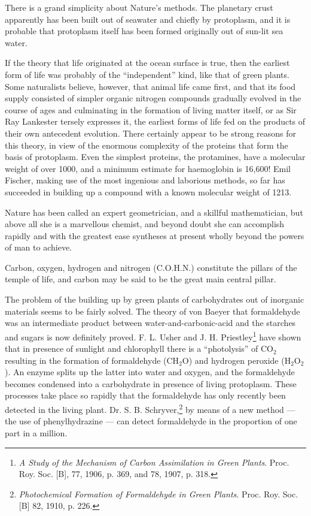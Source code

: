 \documentclass[a4paper, 12pt, oneside, landscape]{article}
\begin{document}
There is a grand simplicity about Nature's methods. The planetary crust apparently has been built out of seawater and chiefly by protoplasm, and it is probable that protoplasm itself has been formed originally out of sun-lit sea water.

If the theory that life originated at the ocean surface is true, then the earliest form of life was probably of the ``independent'' kind, like that of green plants. Some naturalists believe, however, that animal life came first, and that its food supply consisted of simpler organic nitrogen compounds gradually evolved in the course of ages and culminating in the formation of living matter itself, or as Sir Ray Lankester tersely expresses it, the earliest forms of life fed on the products of their own antecedent evolution. There certainly appear to be strong reasons for this theory, in view of the enormous complexity of the proteins that form the basis of protoplasm. Even the simplest proteins, the protamines, have a molecular weight of over 1000, and a minimum estimate for haemoglobin is 16,600! Emil Fischer, making use of the most ingenious and laborious methods, so far has succeeded in building up a compound with a known molecular weight of 1213.

Nature has been called an expert geometrician, and a skillful mathematician, but above all she is a marvellous chemist, and beyond doubt she can accomplish rapidly and with the greatest ease syntheses at present wholly beyond the powers of man to achieve.

Carbon, oxygen, hydrogen and nitrogen (C.O.H.N.) constitute the pillars of the temple of life, and carbon may be said to be the great main central pillar.

The problem of the building up by green plants of carbohydrates out of inorganic materials seems to be fairly solved. The theory of von Baeyer that formaldehyde was an intermediate product between water-and-carbonic-acid and the starches and sugars is now definitely proved. F. L. Usher and J. H. Priestley\footnote{\emph{A Study of the Mechanism of Carbon Assimilation in Green Plants}. Proc. Roy. Soc. [B], 77, 1906, p. 369, and 78, 1907, p. 318.} have shown that in presence of sunlight and chlorophyll there is a ``photolysis'' of CO$_{2}$ resulting in the formation of formaldehyde (CH$_{2}$O) and hydrogen peroxide (H$_{2}$O$_{2}$). An enzyme splits up the latter into water and oxygen, and the formaldehyde becomes condensed into a carbohydrate in presence of living protoplasm. These processes take place so rapidly that the formaldehyde has only recently been detected in the living plant. Dr. S. B. Schryver,\footnote{\emph{Photochemical Formation of Formaldehyde in Green Plants}. Proc. Roy. Soc. [B] 82, 1910, p. 226.} by means of a new method --- the use of phenylhydrazine --- can detect formaldehyde in the proportion of one part in a million.
\end{document}
